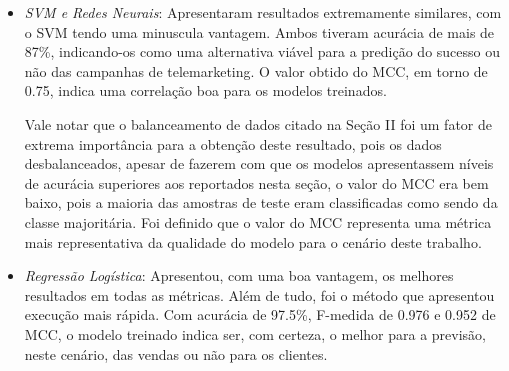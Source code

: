 \begin{itemize}
\item \emph{SVM e Redes Neurais}: Apresentaram resultados extremamente similares, com o SVM tendo uma minuscula vantagem. Ambos tiveram acurácia de mais de 87\%, indicando-os como uma alternativa viável para a predição do sucesso ou não das campanhas de telemarketing. O valor obtido do MCC, em torno de 0.75, indica uma correlação boa para os modelos treinados.

Vale notar que o balanceamento de dados citado na Seção II foi um fator de extrema importância para a obtenção deste resultado, pois os dados desbalanceados, apesar de fazerem com que os modelos apresentassem níveis de acurácia superiores aos reportados nesta seção, o valor do MCC era bem baixo, pois a maioria das amostras de teste eram classificadas como sendo da classe majoritária. Foi definido que o valor do MCC representa uma métrica mais representativa da qualidade do modelo para o cenário deste trabalho.

 \item \emph{Regressão Logística}: Apresentou, com uma boa vantagem, os melhores resultados em todas as métricas. Além de tudo, foi o método que apresentou execução mais rápida. Com acurácia de 97.5\%, F-medida de 0.976 e 0.952 de MCC, o modelo treinado indica ser, com certeza, o melhor para a previsão, neste cenário, das vendas ou não para os clientes.
\end{itemize}
